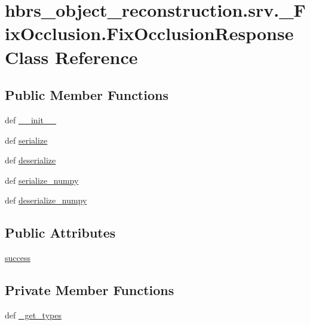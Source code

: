 \hypertarget{classhbrs__object__reconstruction_1_1srv_1_1___fix_occlusion_1_1_fix_occlusion_response}{\section{hbrs\-\_\-object\-\_\-reconstruction.\-srv.\-\_\-\-Fix\-Occlusion.\-Fix\-Occlusion\-Response \-Class \-Reference}
\label{classhbrs__object__reconstruction_1_1srv_1_1___fix_occlusion_1_1_fix_occlusion_response}
}
\subsection*{\-Public \-Member \-Functions}
\begin{DoxyCompactItemize}
\item 
def \hyperlink{classhbrs__object__reconstruction_1_1srv_1_1___fix_occlusion_1_1_fix_occlusion_response_a88d96783ab4d301e81d9a8846922fe16}{\-\_\-\-\_\-init\-\_\-\-\_\-}
\item 
def \hyperlink{classhbrs__object__reconstruction_1_1srv_1_1___fix_occlusion_1_1_fix_occlusion_response_a5121d16439e96b5ab587da8abdb3126b}{serialize}
\item 
def \hyperlink{classhbrs__object__reconstruction_1_1srv_1_1___fix_occlusion_1_1_fix_occlusion_response_a5ac22047031f0b87c9763559af9a1040}{deserialize}
\item 
def \hyperlink{classhbrs__object__reconstruction_1_1srv_1_1___fix_occlusion_1_1_fix_occlusion_response_a2216a3c031c664cf516b26521e6e54f2}{serialize\-\_\-numpy}
\item 
def \hyperlink{classhbrs__object__reconstruction_1_1srv_1_1___fix_occlusion_1_1_fix_occlusion_response_a0e1eacbcd79671719b15021e29c67936}{deserialize\-\_\-numpy}
\end{DoxyCompactItemize}
\subsection*{\-Public \-Attributes}
\begin{DoxyCompactItemize}
\item 
\hyperlink{classhbrs__object__reconstruction_1_1srv_1_1___fix_occlusion_1_1_fix_occlusion_response_a440ad61396277551c4f88a93eb92373a}{success}
\end{DoxyCompactItemize}
\subsection*{\-Private \-Member \-Functions}
\begin{DoxyCompactItemize}
\item 
def \hyperlink{classhbrs__object__reconstruction_1_1srv_1_1___fix_occlusion_1_1_fix_occlusion_response_ad35c47df0d0c54946e97992392c814e4}{\-\_\-get\-\_\-types}
\end{DoxyCompactItemize}
